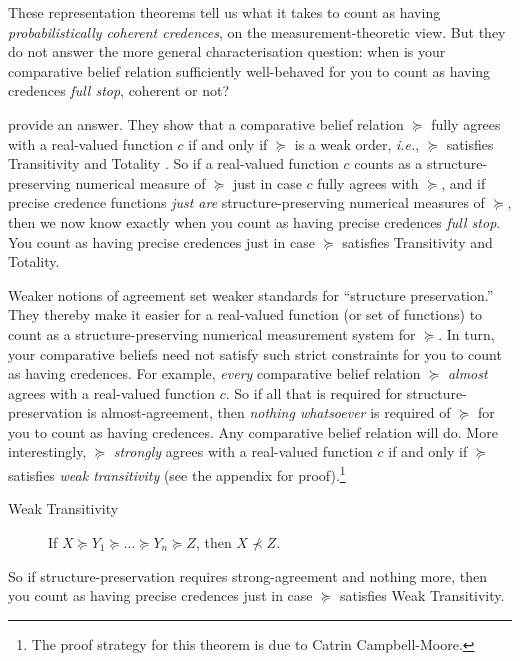 These representation theorems tell us what it takes to count as having \textit{probabilistically coherent credences}, on the measurement-theoretic view. But they do not answer the more general characterisation question: when is your comparative belief relation sufficiently well-behaved for you to count as having credences \textit{full stop}, coherent or not?




\citet{Krantz1971} provide an answer. They show that a comparative belief relation $\succeq$ fully agrees with a real-valued function $c$ if and only if $\succeq$ is a weak order, \textit{i.e.}, $\succeq$ satisfies Transitivity and Totality \citep[p. 15, Theorem 1]{Krantz1971}. So if a real-valued function $c$ counts as a structure-preserving numerical measure of $\succeq$ just in case $c$ fully agrees with $\succeq$, and if precise credence functions \textit{just are} structure-preserving numerical measures of $\succeq$, then we now know exactly when you count as having precise credences \textit{full stop}. You count as having precise credences just in case $\succeq$ satisfies Transitivity and Totality.

Weaker notions of agreement set weaker standards for ``structure preservation.'' They thereby make it easier for a real-valued function (or set of functions) to count as a structure-preserving numerical measurement system for $\succeq$. In turn, your comparative beliefs need not satisfy such strict constraints for you to count as having credences. For example, \textit{every} comparative belief relation $\succeq$ \textit{almost} agrees with a real-valued function $c$. So if all that is required for structure-preservation is almost-agreement, then \textit{nothing whatsoever} is required of $\succeq$ for you to count as having credences. Any comparative belief relation will do. More interestingly, $\succeq$ \textit{strongly} agrees with a real-valued function $c$ if and only if $\succeq$ satisfies \textit{weak transitivity} (see the appendix for proof).\footnote{The proof strategy for this theorem is due to Catrin Campbell-Moore.}
\begin{description}
\item[Weak Transitivity] If $X\succeq Y_1\succeq\hdots\succeq Y_n\succeq Z$, then $X\not\prec Z$.
\end{description}
So if structure-preservation requires strong-agreement and nothing more, then you count as having precise credences just in case $\succeq$ satisfies Weak Transitivity.

